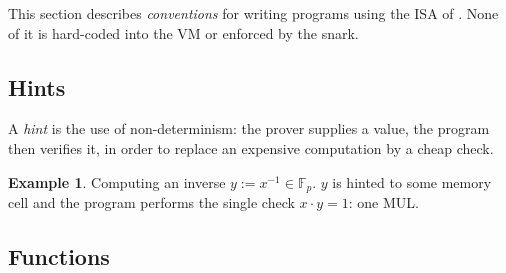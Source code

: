\documentclass{article}
\theoremstyle{definition}
\newtheorem{exmp}{Example}[section]
\newcommand{\Fp}{\mathbb F_p}
\begin{document}
This section describes \emph{conventions} for writing programs using the ISA of . None of it is hard-coded into the VM or enforced by the snark.

\subsection{Hints}\label{sec:hints}

A \emph{hint} is the use of non-determinism: the prover supplies a value, the program then verifies it, in order to replace an expensive computation by a cheap check.

\begin{exmp} Computing an inverse $y := x^{-1} \in \Fp$. $y$ is hinted to some memory cell and the program performs the single check $x \cdot y = 1$: one MUL.
\end{exmp}


\subsection{Functions}\label{sec:functions}
\end{document}
